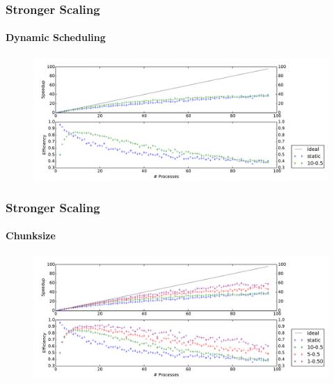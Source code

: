 \begin{frame}
    \frametitle{Stronger Scaling}
    \framesubtitle{Dynamic Scheduling}

    \begin{figure}
        \centering
        \includegraphics[width=\textwidth]{content/img/strong_scaling_time_first}
    \end{figure}

\end{frame}

\begin{frame}
    \frametitle{Stronger Scaling}
    \framesubtitle{Chunksize}

    \begin{figure}
        \centering
        \includegraphics[width=\textwidth]{content/img/strong_scaling_time_chunksize}
    \end{figure}

\end{frame}

